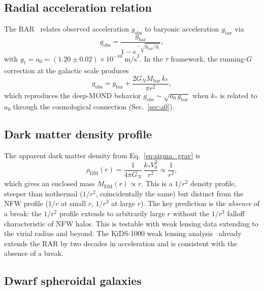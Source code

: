 \documentclass[prd,twocolumn,superscriptaddress,longbibliography,floatfix]{revtex4-2}
\newcommand{\tauasym}{\tau}
\begin{document}
\subsection{Radial acceleration relation}

The RAR~\cite{McGaughRAR2016} relates observed acceleration
$g_{\mathrm{obs}}$ to baryonic acceleration $g_{\mathrm{bar}}$
via
\begin{equation}
g_{\mathrm{obs}} = \frac{g_{\mathrm{bar}}}
{1 - e^{-\sqrt{g_{\mathrm{bar}}/g_\dagger}}},
\label{eq:RAR}
\end{equation}
with $g_\dagger = a_0 = (1.20 \pm 0.02) \times 10^{-10}\;
\mathrm{m/s}^2$.  In the $\tauasym$ framework, the
running-$G$ correction at the galactic scale produces
\begin{equation}
g_{\mathrm{obs}} = g_{\mathrm{bar}} +
\frac{2G_N M_{\mathrm{bar}}\, k_*}{\pi r^2},
\label{eq:g_obs}
\end{equation}
which reproduces the deep-MOND behavior
$g_{\mathrm{obs}} \sim \sqrt{a_0\, g_{\mathrm{bar}}}$
when $k_*$ is related to $a_0$ through the cosmological
connection (Sec.~\ref{sec:a0}).

\subsection{Dark matter density profile}

The apparent dark matter density from
Eq.~\eqref{eq:sigma_grav} is
\begin{equation}
\rho_{\mathrm{DM}}(r) = \frac{1}{4\pi G_N}\,
\frac{k_* V_0^2}{r^2} \propto \frac{1}{r^2},
\label{eq:rho_dm}
\end{equation}
which gives an enclosed mass $M_{\mathrm{DM}}(r) \propto r$.
This is a $1/r^2$ density profile, steeper than isothermal
($1/r^2$, coincidentally the same) but distinct from the
NFW profile ($1/r$ at small $r$, $1/r^3$ at large $r$).
The key prediction is the \emph{absence} of a break:
the $1/r^2$ profile extends to arbitrarily large $r$ without
the $1/r^3$ falloff characteristic of NFW halos.  This is
testable with weak lensing data extending to the
virial radius and beyond.  The KiDS-1000 weak lensing
analysis~\cite{Brouwer2021} already extends the RAR by
two decades in acceleration and is consistent with the
absence of a break.

\subsection{Dwarf spheroidal galaxies}
\end{document}
